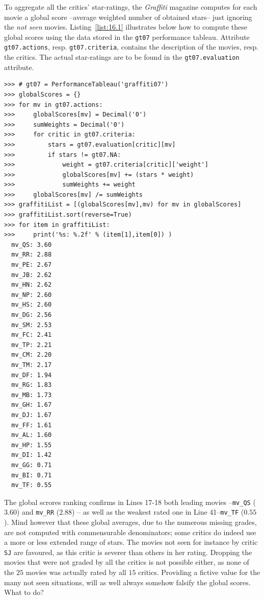 To aggregate all the critics' star-ratings, the \emph{Graffiti} magazine computes for each movie a global score --average weighted number of obtained stars-- just ignoring the \emph{not seen} movies. Listing~\vref{list:16.1} illustrates below how to compute these global scores using the data stored in the \texttt{gt07} performance tableau. Attribute \texttt{gt07.actions}, resp. \texttt{gt07.criteria}, contains the description of the movies, resp. the critics. The actual star-ratings are to be found in the \texttt{gt07.evaluation} attribute.
\begin{lstlisting}[caption={Computing the average weighted number of stars per movie},label=list:16.1,basicstyle=\ttfamily\scriptsize]
>>> # gt07 = PerformanceTableau('graffiti07')
>>> globalScores = {}
>>> for mv in gt07.actions:
>>>     globalScores[mv] = Decimal('0')
>>>     sumWeights = Decimal('0')
>>>     for critic in gt07.criteria:
>>>         stars = gt07.evaluation[critic][mv]
>>>         if stars != gt07.NA:
>>>             weight = gt07.criteria[critic]['weight']
>>>             globalScores[mv] += (stars * weight)
>>>             sumWeights += weight
>>>     globalScores[mv] /= sumWeights
>>> graffitiList = [(globalScores[mv],mv) for mv in globalScores]
>>> graffitiList.sort(reverse=True)
>>> for item in graffitiList:
>>>     print('%s: %.2f' % (item[1],item[0]) )
  mv_QS: 3.60
  mv_RR: 2.88
  mv_PE: 2.67
  mv_JB: 2.62
  mv_HN: 2.62
  mv_NP: 2.60
  mv_HS: 2.60
  mv_DG: 2.56
  mv_SM: 2.53
  mv_FC: 2.41
  mv_TP: 2.21
  mv_CM: 2.20
  mv_TM: 2.17
  mv_DF: 1.94
  mv_RG: 1.83
  mv_MB: 1.73
  mv_GH: 1.67
  mv_DJ: 1.67
  mv_FF: 1.61
  mv_AL: 1.60
  mv_HP: 1.55
  mv_DI: 1.42
  mv_GG: 0.71
  mv_BI: 0.71
  mv_TF: 0.55
\end{lstlisting}

The global scrores ranking confirms in Lines 17-18 both leading movies --\texttt{mv\_QS} ($3.60$) and \texttt{mv\_RR} ($2.88$) -- as well as the weakest rated one in Line 41--\texttt{mv\_TF} ($0.55$). Mind however that these global averages, due to the numerous missing grades, are not computed with commensurable denominators; some critics do indeed use a more or less extended range of stars. The movies not seen for instance by critic \texttt{SJ} are favoured, as this critic is severer than others in her rating. Dropping the movies that were not graded by all the critics is not possible either, as none of the $25$ movies was actually rated by all $15$ critics. Providing a fictive value for the many not seen situations, will as well always somehow falsify the global scores. What to do?

